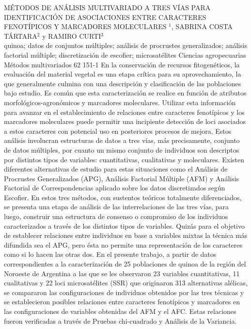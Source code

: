 \A
{MÉTODOS DE ANÁLISIS MULTIVARIADO A TRES VÍAS PARA IDENTIFICACIÓN DE ASOCIACIONES ENTRE CARACTERES FENOTÍPICOS Y MARCADORES MOLECULARES}
{$^1$, SABRINA COSTA TÁRTARA$^2$ y RAMIRO CURTI$^3$}
{
\\}
{quinoa; datos de conjuntos múltiples; análisis de procrustes generalizados; análisis factorial múltiple; discretización de escofier; microsatélites} 
 {Ciencias agropecuarias} 
 {Métodos multivariados} 
 {62} 
 {151-1}
{En la conservación de recursos fitogenéticos, la evaluación del material vegetal es una etapa crítica para su aprovechamiento, la que generalmente culmina con una descripción y clasificación de las poblaciones bajo estudio. Es común que esta caracterización se realice en función de atributos morfológicos-agronómicos y marcadores moleculares. Utilizar esta información para avanzar en el establecimiento de relaciones entre caracteres fenotípicos y los marcadores moleculares puede permitir una incipiente detección de loci asociados a estos caracteres con potencial uso en posteriores procesos de mejora. Estos análisis involucran estructuras de datos a tres vías, más precisamente, conjunto de datos múltiples, por cuanto un mismo conjunto de individuos son descriptos por distintos tipos de variables: cuantitativas, cualitativas y moleculares. Existen diferentes alternativas de estudio para estas situaciones como el Análisis de Procrustes Generalizados (APG), Análisis Factorial Múltiple (AFM) y Análisis Factorial de Correspondencias aplicado sobre los datos discretizados según Escofier. En estos tres métodos, con sustentos teóricos totalmente diferenciados, se presenta una etapa de análisis de las interrelaciones de las tres vías, para luego, construir una estructura de consenso o compromiso de los individuos caracterizados a través de los distintos tipos de variables. Quizás para el objetivo de establecer relaciones entre individuos en base a variables mixtas la técnica más difundida sea el APG, pero ésta no permite una representación de los caracteres como si lo hacen las otras dos. En el presente trabajo, a partir de datos correspondientes a la caracterización de 25 poblaciones de quinoa de la región del Noroeste de Argentina a las que se les observaron 23 variables cuantitativas, 11 cualitativas y 22 loci microsatélites (SSR) que originaron 313 alternativas alélicas, se compararon las configuraciones de individuos obtenidos por las tres técnicas y se establecieron posibles relaciones entre caracteres fenotípicos y marcadores en las configuraciones de variables obtenidas del AFM y el AFC. Estas relaciones fueron verificadas a través de Pruebas chi-cuadrado y Análisis de la Variancia.}
